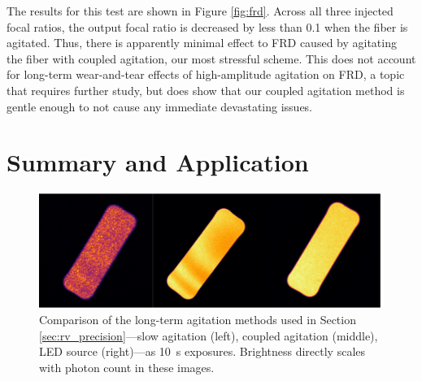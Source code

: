 The results for this test are shown in Figure {\ref{fig:frd}}. Across all three injected focal ratios, the output focal ratio is decreased by less than 0.1 when the fiber is agitated. Thus, there is apparently minimal effect to FRD caused by agitating the fiber with coupled agitation, our most stressful scheme. This does not account for long-term wear-and-tear effects of high-amplitude agitation on FRD, a topic that requires further study, but does show that our coupled agitation method is gentle enough to not cause any immediate devastating issues.

\section{Summary and Application}
\label{sec:conclusions}

\begin{figure}
\centering
	\includegraphics[width=\columnwidth]{figures-2/fiber_rv_error.pdf}
	\caption{Comparison of the long-term agitation methods used in Section \ref{sec:rv_precision}---slow agitation (left), coupled agitation (middle), LED source (right)---as \SI{10}{\second} exposures. Brightness directly scales with photon count in these images.}
\label{fig:fiber_rv_error}
\end{figure}

